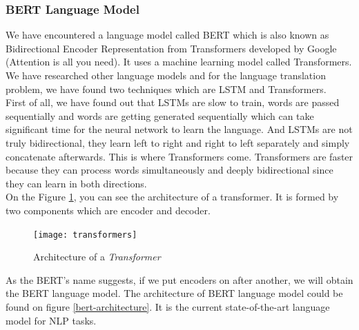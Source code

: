\documentclass{mefsdp}
\begin{document}
	\subsubsection{BERT Language Model}
	We have encountered a language model called BERT which is also known as Bidirectional Encoder Representation from Transformers developed by Google (Attention is all you need). It uses a machine learning model called Transformers. We have researched other language models and for the language translation problem, we have found two techniques which are LSTM and Transformers.\\
	
	First of all, we have found out that LSTMs are slow to train, words are passed sequentially and words are getting generated sequentially which can take significant time for the neural network to learn the language. And LSTMs are not truly bidirectional, they learn left to right and right to left separately and simply concatenate afterwards. This is where Transformers come. Transformers are faster because they can process words simultaneously and deeply bidirectional since they can learn in both directions. \\
	
	On the Figure \ref{transformer}, you can see the architecture of a transformer. It is formed by two components which are encoder and decoder.\\
	\begin{figure}[ht!]
		\centering
		\texttt{[image: transformers]}
		\caption{Architecture of a \textit{Transformer}\label{transformer}}
	\end{figure}

	As the BERT’s name suggests, if we put encoders on after another, we will obtain the BERT language model. The architecture of BERT language model could be found on figure \ref{bert-architecture}. It is the current state-of-the-art language model for NLP tasks. \cite{chan-fan-2019-recurrent}
	
\end{document}
